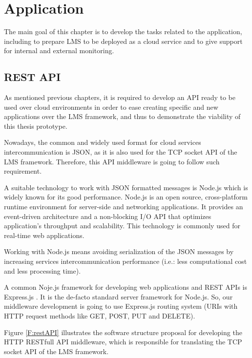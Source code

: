 \chapter{Application}\label{D:application}

The main goal of this chapter is to develop the tasks related to the application, including to prepare LMS to be deployed as a cloud service and to give support for internal and external monitoring.

\section{REST API}

As mentioned previous chapters, it is required to develop an API ready to be used over cloud environments in order to ease creating specific and new applications over the LMS framework, and thus to demonstrate the viability of this thesis prototype.

Nowadays, the common and widely used format for cloud services intercommunication is JSON, as it is also used for the TCP socket API of the LMS framework. Therefore, this API middleware is going to follow such requirement.

A suitable technology to work with JSON formatted messages is Node.js \cite{nodejs} which is widely known for its good performance. Node.js is an open source, cross-platform runtime environment for server-side and networking applications. It provides an event-driven architecture and a non-blocking I/O API that optimizes application's throughput and scalability. This technology is commonly used for real-time web applications. 

Working with Node.js means avoiding serialization of the JSON messages by increasing services intercommunication performance (i.e.: less computational cost and less processing time). 

A common Noje.js framework for developing web applications and REST APIs is Express.js \cite{expressjs}. It is the de-facto standard server framework for Node.js. So, our middleware development is going to use Express.js routing system (URIs with HTTP request methods like GET, POST, PUT and DELETE).

Figure \ref{F:restAPI} illustrates the software structure proposal for developing the HTTP RESTfull API middleware, which is responsible for translating the TCP socket API of the LMS framework.

